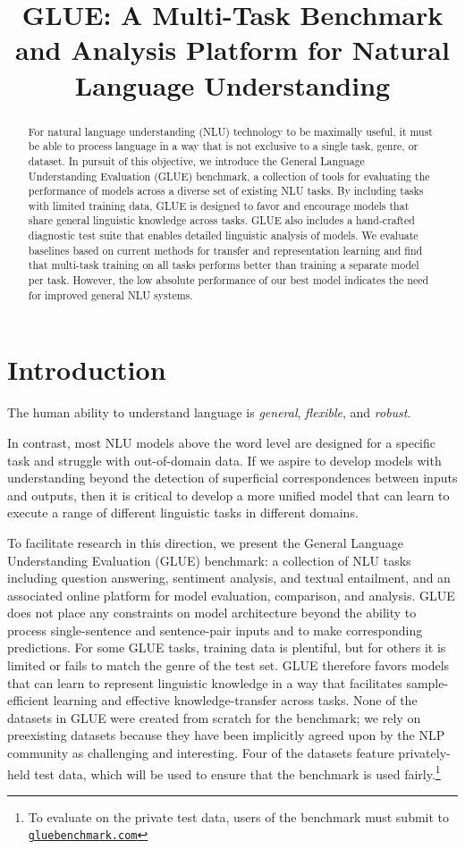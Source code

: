 \title{GLUE: A Multi-Task Benchmark and Analysis Platform for Natural Language Understanding}

\begin{abstract}
For natural language understanding (NLU) technology to be maximally useful, it must be able to process language in a way that is not exclusive to a single task, genre, or dataset. In pursuit of this objective, we introduce the General Language Understanding Evaluation (GLUE) benchmark, a collection of tools for evaluating the performance of models across a diverse set of existing NLU tasks. By including tasks with limited training data, GLUE is designed to favor and encourage models that share general linguistic knowledge across tasks. GLUE also includes a hand-crafted diagnostic test suite that enables detailed linguistic analysis of models. We evaluate baselines based on current methods for transfer and representation learning and find that multi-task training on all tasks performs better than training a separate model per task. However, the low absolute performance of our best model indicates the need for improved general NLU systems.
\end{abstract}

\section{Introduction}\label{sec:intro}

The human ability to understand language is \emph{general}, \textit{flexible}, and \textit{robust}. 

In contrast, most NLU models above the word level are designed for a specific task and struggle with out-of-domain data. If we aspire to develop models with understanding beyond the detection of superficial correspondences between inputs and outputs, then it is critical to develop a more unified model that can learn to execute a range of different linguistic tasks in different domains.

To facilitate research in this direction, we present the General Language Understanding Evaluation (GLUE) benchmark: a collection of NLU tasks including question answering, sentiment analysis, and textual entailment, and an associated online platform for model evaluation, comparison, and analysis. GLUE does not place any constraints on model architecture beyond the ability to process single-sentence and sentence-pair inputs and to make corresponding predictions. For some GLUE tasks, training data is plentiful, but for others it is limited or fails to match the genre of the test set. GLUE therefore favors models that can learn to represent linguistic knowledge in a way that facilitates sample-efficient learning and effective knowledge-transfer across tasks. None of the datasets in GLUE were created from scratch for the benchmark; we rely on preexisting datasets because they have been implicitly agreed upon by the NLP community as challenging and interesting. Four of the datasets feature privately-held test data, which will be used to ensure that the benchmark is used fairly.\footnote{To evaluate on the private test data, users of the benchmark must submit to \texttt{\href{gluebenchmark.com}{gluebenchmark.com}}}

